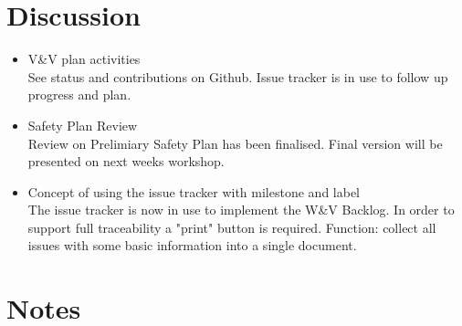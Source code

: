 \documentclass[a4paper, 11pt]{article}
\begin{document}
\section{Discussion}
\begin{itemize}
\item V\&V plan activities\\
See status and contributions on Github. Issue tracker is in use to follow up progress and plan.\\
\item Safety Plan Review\\
Review on Prelimiary Safety Plan has been finalised. Final version will be presented on next weeks workshop.\\
\item Concept of using the issue tracker with milestone and label\\
The issue tracker is now in use to implement the W\&V Backlog. In order to support full traceability a "print" button is required. Function: collect all issues with some basic information into a single document.\\
\end{itemize}


\section{Notes}
\end{document}

